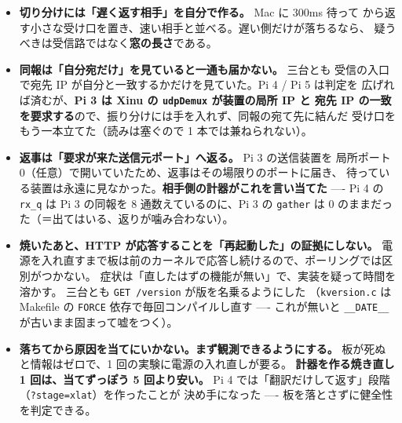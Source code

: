 \documentclass[11pt,a4paper]{ltjsarticle}
\begin{document}
\begin{itemize}
  「100Hz ＝ 1 刻み 10ms」として扱っていたが、Pi 4 / Pi 5 の実測は
  \textbf{1 刻み $\simeq$ 2ms（約 500Hz）}だった。結果、200ms ごとのつもりの
  再送は 40ms 間隔で出て、1500ms のつもりの窓は 240ms で閉じていた。
  症状は「速い相手（1ms で返す Mac）は拾えるが、遅い相手（100ms 超かかる板）は
  必ず落ちる」である。板の中を見ても分からない ---- \textbf{撒いた電文の実時刻を
  外から並べる}と一目で出る（\texttt{42.558 / 42.598 / 42.678 …}）。
  刻みの速さを仮定するのをやめ、\texttt{cntpct\_el0} と \texttt{cntfrq\_el0} から
  直に ms を作った。板ごとの定数も要らない。
  \textbf{同じ誤りを \texttt{remote} の期限も抱えていた} ---- \texttt{timeout 2000}
  と書いても実際は約 400ms で切れていた。速い相手しか使っていなかったので
  表に出ていなかっただけである。
\item \textbf{切り分けには「遅く返す相手」を自分で作る。} Mac に 300ms 待って
  から返す小さな受け口を置き、速い相手と並べる。遅い側だけが落ちるなら、
  疑うべきは受信路ではなく\textbf{窓の長さ}である。
\item \textbf{同報は「自分宛だけ」を見ていると一通も届かない。} 三台とも
  受信の入口で宛先 IP が自分と一致するかだけを見ていた。Pi 4 / Pi 5 は判定を
  広げれば済むが、\textbf{Pi 3 は Xinu の \texttt{udpDemux} が装置の局所 IP と
  宛先 IP の一致を要求する}ので、振り分けには手を入れず、同報の宛て先に結んだ
  受け口をもう一本立てた（読みは塞ぐので 1 本では兼ねられない）。
\item \textbf{返事は「要求が来た送信元ポート」へ返る。} Pi 3 の送信装置を
  局所ポート 0（任意）で開いていたため、返事はその場限りのポートに届き、
  待っている装置は永遠に見なかった。\textbf{相手側の計器がこれを言い当てた}
  ---- Pi 4 の \texttt{rx\_q} は Pi 3 の同報を 8 通数えているのに、Pi 3 の
  \texttt{gather} は 0 のままだった（＝出てはいる、返りが噛み合わない）。
\item \textbf{焼いたあと、HTTP が応答することを「再起動した」の証拠にしない。}
  電源を入れ直すまで板は前のカーネルで応答し続けるので、ポーリングでは区別がつかない。
  症状は「直したはずの機能が無い」で、実装を疑って時間を溶かす。
  三台とも \texttt{GET /version} が版を名乗るようにした
  （\texttt{kversion.c} は Makefile の \texttt{FORCE} 依存で毎回コンパイルし直す
  ---- これが無いと \verb|__DATE__| が古いまま固まって嘘をつく）。
\item \textbf{落ちてから原因を当てにいかない。まず観測できるようにする。}
  板が死ぬと情報はゼロで、1 回の実験に電源の入れ直しが要る。
  \textbf{計器を作る焼き直し 1 回は、当てずっぽう 5 回より安い。}
  Pi 4 では「翻訳だけして返す」段階（\texttt{?stage=xlat}）を作ったことが
  決め手になった ---- 板を落とさずに健全性を判定できる。
\end{itemize}
\end{document}
